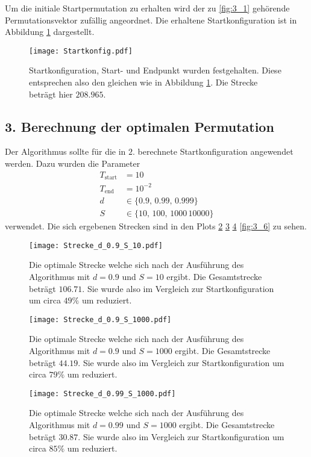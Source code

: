 Um die initiale Startpermutation zu erhalten wird der zu \ref{fig:3_1} gehörende Permutationsvektor zufällig angeordnet.
Die erhaltene Startkonfiguration ist in Abbildung \ref{fig:3_2} dargestellt.

\FloatBarrier
\begin{figure}[H]
    \centering
    \texttt{[image: Startkonfig.pdf]}
    \caption{Startkonfiguration, Start- und Endpunkt wurden festgehalten. Diese entsprechen also den gleichen wie in Abbildung \ref{fig:3_2}.
    Die Strecke beträgt hier $208.965$.}
    \label{fig:3_2}
\end{figure}
\FloatBarrier
\noindent

\subsection*{3. Berechnung der optimalen Permutation}
Der Algorithmus sollte für die in $2.$ berechnete Startkonfiguration angewendet werden.
Dazu wurden die Parameter
\begin{align*}
T_\text{start} &= 10 \\
T_\text{end} &= 10^{-2} \\
d &\in \{0.9,\,0.99,\,0.999\} \\
S &\in \{10,\,100,\,1000\,10000\} 
\end{align*}
verwendet.
Die sich ergebenen Strecken sind in den Plots \ref{fig:3_3} \ref{fig:3_4} \ref{fig:3_5} \ref{fig:3_6} zu sehen.
\FloatBarrier
\begin{figure}[H]
    \centering
    \texttt{[image: Strecke\_d\_0.9\_S\_10.pdf]}
    \caption{Die optimale Strecke welche sich nach der Ausführung des Algorithmus mit $d=0.9$ und $S=10$ ergibt. 
    Die Gesamtstrecke beträgt $106.71$. Sie wurde also im Vergleich zur Startkonfiguration um circa $49\%$ um reduziert.}
    \label{fig:3_3}
\end{figure}
\FloatBarrier
\noindent
\FloatBarrier
\begin{figure}[H]
    \centering
    \texttt{[image: Strecke\_d\_0.9\_S\_1000.pdf]}
    \caption{Die optimale Strecke welche sich nach der Ausführung des Algorithmus mit $d=0.9$ und $S=1000$ ergibt. 
    Die Gesamtstrecke beträgt $44.19$. Sie wurde also im Vergleich zur Startkonfiguration um circa $79\%$ um reduziert.}
    \label{fig:3_4}
\end{figure}
\FloatBarrier
\noindent
\FloatBarrier
\begin{figure}[H]
    \centering
    \texttt{[image: Strecke\_d\_0.99\_S\_1000.pdf]}
    \caption{Die optimale Strecke welche sich nach der Ausführung des Algorithmus mit $d=0.99$ und $S=1000$ ergibt. 
    Die Gesamtstrecke beträgt $30.87$. Sie wurde also im Vergleich zur Startkonfiguration um circa $85\%$ um reduziert.}
    \label{fig:3_5}
\end{figure}
